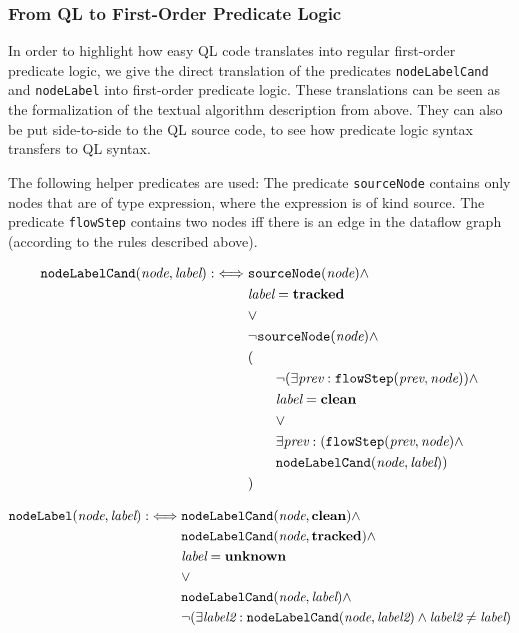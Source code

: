\subsubsection*{From QL to First-Order Predicate Logic}
In order to highlight how easy QL code translates into regular first-order predicate logic,
we give the direct translation of the predicates \texttt{nodeLabelCand} and \texttt{nodeLabel}
into first-order predicate logic.
These translations can be seen as the formalization of the textual algorithm description
from above.
They can also be put side-to-side to the QL source code, to see how predicate logic
syntax transfers to QL syntax.

The following helper predicates are used:
The predicate \texttt{sourceNode} contains only nodes that are of type expression,
where the expression is of kind source.
The predicate \texttt{flowStep} contains two nodes iff there is an edge in the dataflow 
graph (according to the rules described above).

\newcommand{\n}{\textit{node}}
\newcommand{\lab}{\textit{label}}
\newcommand{\labtwo}{\textit{label2}}
\newcommand{\prev}{\textit{prev}}
\begin{align*}
    \texttt{nodeLabelCand}(\n, \lab) :\iff &\texttt{sourceNode}(\n) \land\\
    & \lab = \labtracked \\
    &\lor\\
    & \neg \texttt{sourceNode}(\n) \land\\
    &(\\
    &\qquad\neg(\exists \prev: \texttt{flowStep}(\prev, \n)) \land\\
    &\qquad\lab = \labclean\\
    &\qquad\lor\\
    &\qquad\exists \prev: (\texttt{flowStep}(\prev, \n) \land\\
    &\qquad \texttt{nodeLabelCand}(\n, \lab))\\
    &)
\end{align*}

\begin{align*}
    \texttt{nodeLabel}(\n, \lab) :\iff &\texttt{nodeLabelCand}(\n, \labclean) \land \\
    &\texttt{nodeLabelCand}(\n, \labtracked) \land\\
    &\lab = \labunknown \\
    &\lor\\
    & \texttt{nodeLabelCand}(\n, \lab) \land\\
    &\neg (\exists \labtwo: \texttt{nodeLabelCand}(\n, \labtwo) \land \labtwo \neq \lab)\\
\end{align*}

